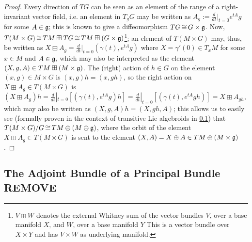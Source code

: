 \begin{proof}
Every direction of $TG$ can be seen as an element of the range of a right-invariant vector field, i.e. an element in $T_g G$ may be written as $A_g :=\frac{d}{dt}|_{t=0}e^{tA}g$ for some $A \in \mathfrak{g}$; this is known to give a diffeomorphism $TG \operatorname{\cong} G \times \mathfrak{g}$. Now, $T(M \times G) \operatorname{\cong} TM \boxplus TG \operatorname{\cong} TM \boxplus (G \times \mathfrak{g})$\footnote{$V \boxplus W$ denotes the external Whitney sum of the vector bundles $V$, over a base manifold $X$, and $W$, over a base manifold $Y$ This is a vector bundle over $X \times Y$ and has $V \times W$ as underlying manifold.}; an element of $T(M \times G)$ may, thus, be written as $X \boxplus A_g = \frac{d}{dt}|_{t = 0}(\gamma(t), e^{tA}g)$ where $X = \gamma'(0) \in T_x M$ for some $x \in M$ and $A \in \mathfrak{g}$, which may also be interpreted as the element $(X, g, A) \in TM \boxplus (M \times \mathfrak{g})$. The (right) action of $h \in G$ on the element $(x, g) \in M\times G$ is $(x, g)h = (x, gh)$, so the right action on $X \boxplus A_g \in T(M \times G)$ is $(X \boxplus A_g)h = \frac{d}{dt}|_{t=0}[(\gamma(t), e^{tA}g)h] = \frac{d}{dt}|_{t=0}[(\gamma(t), e^{tA}gh)] = X \boxplus A_{gh}$, which may also be written as $(X, g, A)h = (X, gh, A)$; this allows us to easily see (formally proven in the context of transitive Lie algebroids in \ref{}) that $T(M \times G)/G \operatorname{\cong} TM \oplus (M \oplus \mathfrak{g})$, where the orbit of the element $X \boxplus A_g \in T(M \times G)$ is sent to the element $(X, A) = X \oplus A \in TM \oplus (M \times \mathfrak{g})$.
\end{proof}






\subsection{The Adjoint Bundle of a Principal Bundle REMOVE}


